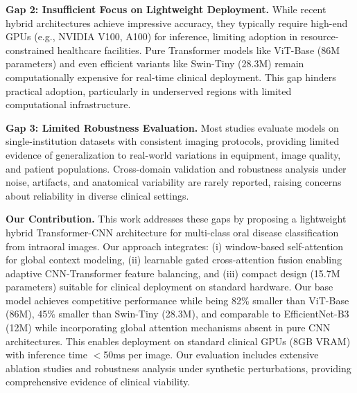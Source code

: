 \textbf{Gap 2: Insufficient Focus on Lightweight Deployment.} While recent hybrid architectures achieve impressive accuracy, they typically require high-end GPUs (e.g., NVIDIA V100, A100) for inference, limiting adoption in resource-constrained healthcare facilities. Pure Transformer models like ViT-Base (86M parameters) and even efficient variants like Swin-Tiny (28.3M) remain computationally expensive for real-time clinical deployment. This gap hinders practical adoption, particularly in underserved regions with limited computational infrastructure.

\textbf{Gap 3: Limited Robustness Evaluation.} Most studies evaluate models on single-institution datasets with consistent imaging protocols, providing limited evidence of generalization to real-world variations in equipment, image quality, and patient populations. Cross-domain validation and robustness analysis under noise, artifacts, and anatomical variability are rarely reported, raising concerns about reliability in diverse clinical settings.

\textbf{Our Contribution.} This work addresses these gaps by proposing a lightweight hybrid Transformer-CNN architecture for multi-class oral disease classification from intraoral images. Our approach integrates: (i) window-based self-attention for global context modeling, (ii) learnable gated cross-attention fusion enabling adaptive CNN-Transformer feature balancing, and (iii) compact design (15.7M parameters) suitable for clinical deployment on standard hardware. Our base model achieves competitive performance while being 82\% smaller than ViT-Base (86M), 45\% smaller than Swin-Tiny (28.3M), and comparable to EfficientNet-B3 (12M) while incorporating global attention mechanisms absent in pure CNN architectures. This enables deployment on standard clinical GPUs (8GB VRAM) with inference time $<$50ms per image. Our evaluation includes extensive ablation studies and robustness analysis under synthetic perturbations, providing comprehensive evidence of clinical viability.
